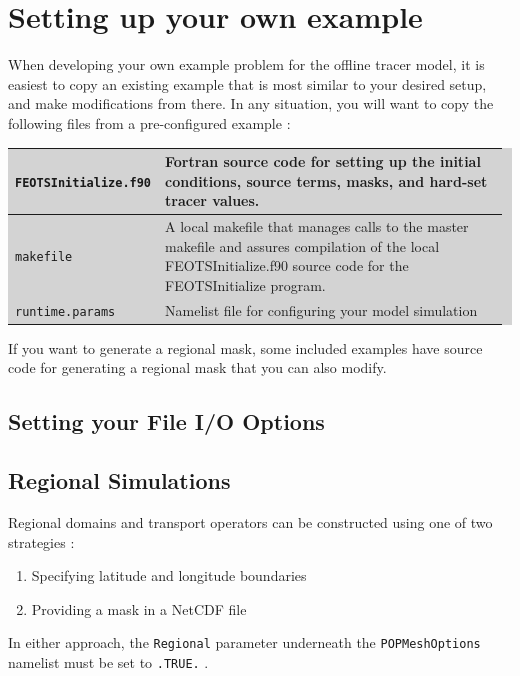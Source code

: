 \documentclass{softwaremanual}
\begin{document}
\section{Setting up your own example}
 When developing your own example problem for the offline tracer model, it is easiest to copy an existing example that is most similar to your desired setup, and make modifications from there. In any situation, you will want to copy the following files from a pre-configured example :
 
 \vspace{0.5cm}
 \begin{flushleft}
\begingroup\setlength{\fboxsep}{0pt}
  \colorbox{lightgray}{
    \begin{tabular}{p{0.25\linewidth} | p{0.725\linewidth}}
    \toprule
    \texttt{FEOTSInitialize.f90} & Fortran source code for setting up the initial conditions, source terms, masks, and hard-set tracer values.\\
    \midrule
    \texttt{makefile} & A local makefile that manages calls to the master makefile and assures compilation of the local FEOTSInitialize.f90 source code for the FEOTSInitialize program. \\
    \midrule
    \texttt{runtime.params} & Namelist file for configuring your model simulation\\
    \bottomrule
\end{tabular}
}\endgroup
\end{flushleft}
\vspace{0.5cm}
If you want to generate a regional mask, some included examples have source code for generating a regional mask that you can also modify.

\subsection{Setting your File I/O Options}

\subsection{Regional Simulations}
Regional domains and transport operators can be constructed using one of two strategies :
\begin{enumerate}
\item Specifying latitude and longitude boundaries
\item Providing a mask in a NetCDF file
\end{enumerate} 
In either approach, the \texttt{Regional} parameter underneath the \texttt{POPMeshOptions} namelist must be set to \texttt{.TRUE.} .
\end{document}

